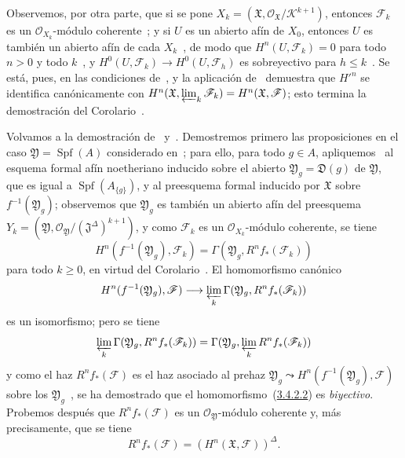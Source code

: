 Observemos, por otra parte, que si se pone $X_k=(\mathfrak X,\mathcal O_{\mathfrak X}/\mathcal K^{k+1})$, entonces $\mathcal F_k$ es un $\mathcal O_{X_k}$-módulo coherente~; y si $U$ es un abierto afín de $X_0$, entonces $U$ es también un abierto afín de cada $X_k$~, de modo que $H^n(U,\mathcal F_k)=0$ para todo $n>0$ y todo $k$~, y $H^0(U,\mathcal F_k)\to H^0(U,\mathcal F_h)$ es sobreyectivo para $h\leq k$~.
Se está, pues, en las condiciones de~, y la aplicación de~ demuestra que $H'^{n}$ se identifica canónicamente con $H^n(\mathfrak X,\varprojlim_k\mathcal F_k)=H^n(\mathfrak X,\mathcal F)$; esto termina la demostración del Corolario~.

\begin{env}[3.4.5]
\label{III.3.4.5}
\label{III.3.4.5-fr}
Volvamos a la demostración de~ y~.
Demostremos primero las proposiciones en el caso $\mathfrak Y=\operatorname{Spf}(A)$ considerado en~; para ello, para todo $g\in A$, apliquemos~ al esquema formal afín noetheriano inducido sobre el abierto $\mathfrak Y_g=\mathfrak D(g)$ de $\mathfrak Y$, que es igual a $\operatorname{Spf}(A_{\{g\}})$, y al preesquema formal inducido por $\mathfrak X$ sobre $f^{-1}(\mathfrak Y_g)$; observemos que $\mathfrak Y_g$ es también un abierto afín del preesquema $Y_k=(\mathfrak Y,\mathcal O_{\mathfrak Y}/(\mathfrak J^\Delta)^{k+1})$, y como $\mathcal F_k$ es un $\mathcal O_{X_k}$-módulo coherente, se tiene
\[
H^n(f^{-1}(\mathfrak Y_g),\mathcal F_k)
=\Gamma(\mathfrak Y_g,R^nf_*(\mathcal F_k))
\]
para todo $k\geq0$, en virtud del Corolario~.
El homomorfismo canónico
\[
H^n(f^{-1}(\mathfrak Y_g),\mathcal F)
\longrightarrow\varprojlim_k\Gamma(\mathfrak Y_g,R^nf_*(\mathcal F_k))
\]
es un isomorfismo; pero se tiene~
\[
\varprojlim_k\Gamma(\mathfrak Y_g,R^nf_*(\mathcal F_k))
=\Gamma(\mathfrak Y_g,\varprojlim_kR^nf_*(\mathcal F_k))
\]
y como el haz $R^nf_*(\mathcal F)$ es el haz asociado al prehaz $\mathfrak Y_g\leadsto H^n(f^{-1}(\mathfrak Y_g),\mathcal F)$ sobre los $\mathfrak Y_g$~, se ha demostrado que el homomorfismo~(\hyperref[III.3.4.2.2]{3.4.2.2}) es \emph{biyectivo}.
Probemos después que $R^nf_*(\mathcal F)$ es un $\mathcal O_{\mathfrak Y}$-módulo coherente y, más precisamente, que se tiene
\[
R^nf_*(\mathcal F)=(H^n(\mathfrak X,\mathcal F))^\Delta.
\tag{3.4.5.1}\label{III.3.4.5.1-fr}
\]


\end{env}

